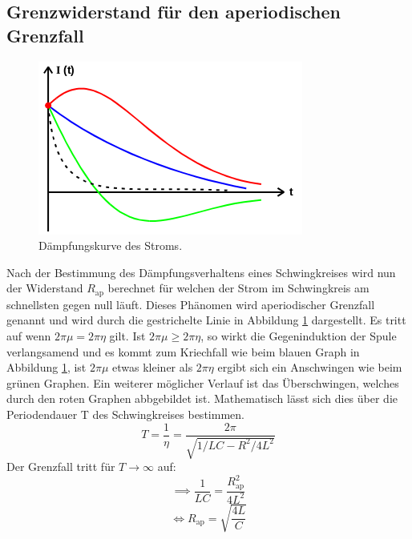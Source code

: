 \subsection{Grenzwiderstand für den aperiodischen Grenzfall}
\begin{figure}[H]
  \centering
  \includegraphics{content/images/dia2.png}
  \caption{Dämpfungskurve des Stroms\cite{anleitung}.}
  \label{fig:aperiodisch}
\end{figure}
Nach der Bestimmung des Dämpfungsverhaltens eines Schwingkreises
wird nun der Widerstand $R_\text{ap}$ berechnet für welchen der
Strom im Schwingkreis am schnellsten gegen null läuft. Dieses
Phänomen wird aperiodischer Grenzfall genannt und wird durch
die gestrichelte Linie in Abbildung \ref{fig:aperiodisch}
dargestellt. Es tritt auf wenn $2\pi\mu=2\pi\eta$ gilt. Ist $2\pi\mu\geq 2\pi\eta$, so wirkt die Gegeninduktion der
Spule verlangsamend und es kommt zum Kriechfall wie beim blauen Graph in Abbildung \ref{fig:aperiodisch}, ist
$2\pi\mu$ etwas kleiner als $2\pi\eta$
ergibt sich ein Anschwingen wie beim grünen Graphen. Ein weiterer möglicher
Verlauf ist das Überschwingen, welches durch den roten Graphen abbgebildet ist.
Mathematisch lässt sich dies über die Periodendauer T des
Schwingkreises bestimmen.
\begin{equation}
  T = \frac{1}{\eta} = \frac{2\pi}{\sqrt{1/LC-R^2/4L^2}}
\end{equation}
Der Grenzfall tritt für $T\to\infty$ auf:
\begin{equation}
  \implies \frac{1}{LC}=\frac{R_\text{ap}^2}{4L^2}
\end{equation}
\begin{equation}
  \iff R_\text{ap} =\sqrt{\frac{4L}{C}}
  \label{eqn:R11}
\end{equation}

